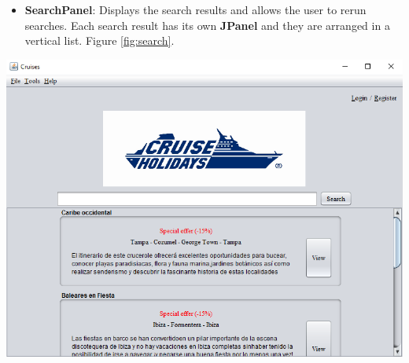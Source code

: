 \documentclass[11pt]{article}
\begin{document}
	\begin{qn}
		\begin{itemize}
	   	    \item \textbf{SearchPanel}: Displays the search results and allows the user to rerun searches. Each search result has its own \textbf{JPanel} and they are arranged in a vertical list. Figure \ref{fig:search}.
	   	\end{itemize}
	   	\begin{center}
			\begin{minipage}{0.8\linewidth}
				\includegraphics[width=\linewidth]{images/search.png}
				\label{fig:search}
			\end{minipage}
	    \end{center}
	\end{qn}
	
\end{document}
